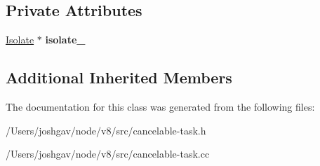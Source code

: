 \subsection*{Private Attributes}
\begin{DoxyCompactItemize}
\item 
\hyperlink{classv8_1_1internal_1_1_isolate}{Isolate} $\ast$ {\bfseries isolate\+\_\+}\hypertarget{classv8_1_1internal_1_1_cancelable_task_a41909c8455d6d20b0b5935ed19ea9547}{}\label{classv8_1_1internal_1_1_cancelable_task_a41909c8455d6d20b0b5935ed19ea9547}

\end{DoxyCompactItemize}
\subsection*{Additional Inherited Members}


The documentation for this class was generated from the following files\+:\begin{DoxyCompactItemize}
\item 
/\+Users/joshgav/node/v8/src/cancelable-\/task.\+h\item 
/\+Users/joshgav/node/v8/src/cancelable-\/task.\+cc\end{DoxyCompactItemize}
